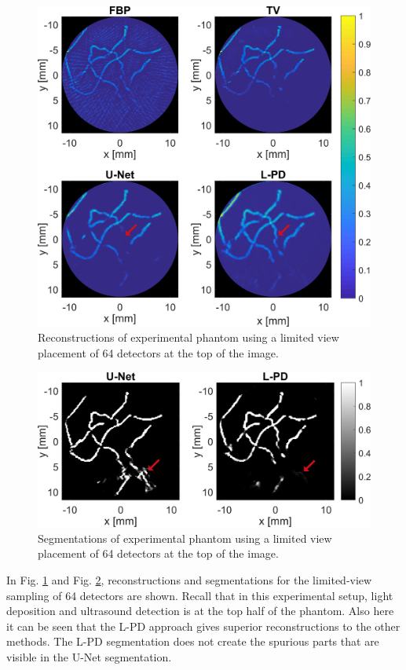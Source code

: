 \documentclass[journal]{IEEEtran}
\begin{document}
\begin{figure}[ht!]
\centering
\includegraphics[width=\linewidth]{images//paper_exp_nonuni_recon.png}
\caption{Reconstructions of experimental phantom using a limited view placement of 64 detectors at the top of the image.}
\label{fig:exp_nonuni_recon}
\end{figure}

\begin{figure}[ht!]
\centering
\includegraphics[width=\linewidth]{images//paper_exp_nonuni_segm.png}
\caption{Segmentations of experimental phantom using a limited view placement of 64 detectors at the top of the image.}
\label{fig:exp_nonuni_segm}
\end{figure}

In Fig. \ref{fig:exp_nonuni_recon} and Fig. \ref{fig:exp_nonuni_segm}, reconstructions and segmentations for the limited-view sampling of 64 detectors are shown. Recall that in this experimental setup, light deposition and ultrasound detection is at the top half of the phantom. Also here it can be seen that the L-PD approach gives superior reconstructions to the other methods. The L-PD segmentation does not create the spurious parts that are visible in the U-Net segmentation. 
\end{document}
